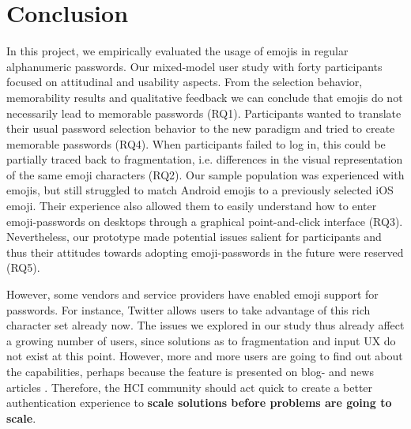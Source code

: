 



\section{Conclusion}
In this project, we empirically evaluated the usage of emojis in regular alphanumeric passwords. Our mixed-model user study with forty participants focused on attitudinal and usability aspects. From the selection behavior, memorability results and qualitative feedback we can conclude that emojis do not necessarily lead to memorable passwords (RQ1). Participants wanted to translate their usual password selection behavior to the new paradigm and tried to create memorable passwords (RQ4). When participants failed to log in, this could be partially traced back to fragmentation, i.e. differences in the visual representation of the same emoji characters (RQ2). Our sample population was experienced with emojis, but still struggled to match Android emojis to a previously selected iOS emoji. Their experience also allowed them to easily understand how to enter emoji-passwords on desktops through a graphical point-and-click interface (RQ3). Nevertheless, our prototype made potential issues salient for participants and thus their attitudes towards adopting emoji-passwords in the future were reserved (RQ5). 

However, some vendors and service providers have enabled emoji support for passwords. For instance, Twitter allows users to take advantage of this rich character set already now. The issues we explored in our study thus already affect a growing number of users, since solutions as to fragmentation and input UX do not exist at this point. However, more and more users are going to find out about the capabilities, perhaps because the feature is presented on blog- and news articles \cite{Dashinsky2015NoEmojisInPWs}. Therefore, the HCI community should act quick to create a better authentication experience to \textbf{scale solutions before problems are going to scale}. 

